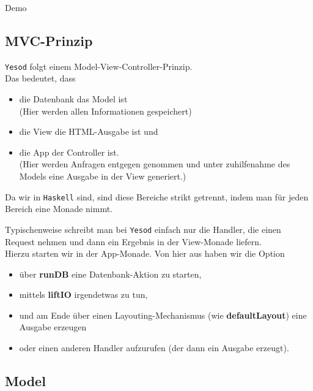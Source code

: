 \documentclass{beamer}
\begin{document}
\begin{frame}[fragile]
Demo
\end{frame}

\subsection{MVC-Prinzip}

\begin{frame}[fragile]
\texttt{Yesod} folgt einem Model-View-Controller-Prinzip. \\\pause
Das bedeutet, dass
\begin{itemize}
 \item die Datenbank das Model ist\\\pause
       (Hier werden allen Informationen gespeichert)
 \pause
 \item die View die HTML-Ausgabe ist und
 \pause
 \item die App der Controller ist.\\\pause
       (Hier werden Anfragen entgegen genommen und unter zuhilfenahme des Models eine Ausgabe in der View generiert.)
\end{itemize}
\pause
Da wir in \texttt{Haskell} sind, sind diese Bereiche strikt getrennt, indem man für jeden Bereich eine Monade nimmt.
\end{frame}

\begin{frame}[fragile]
Typischenweise schreibt man bei \texttt{Yesod} einfach nur die Handler, die einen Request nehmen und dann ein Ergebnis in der View-Monade liefern.\\\pause
Hierzu starten wir in der \glqq App\grqq -Monade. Von hier aus haben wir die Option
\begin{itemize}
\pause
 \item über \textbf{runDB} eine Datenbank-Aktion zu starten,
\pause
 \item mittels \textbf{liftIO} irgendetwas zu tun,
\pause
 \item und am Ende über einen Layouting-Mechanismus (wie \textbf{defaultLayout}) eine Ausgabe erzeugen
\pause
 \item oder einen anderen Handler aufzurufen (der dann ein Ausgabe erzeugt).
\end{itemize}
\end{frame}



\subsection{Model}
\end{document}
